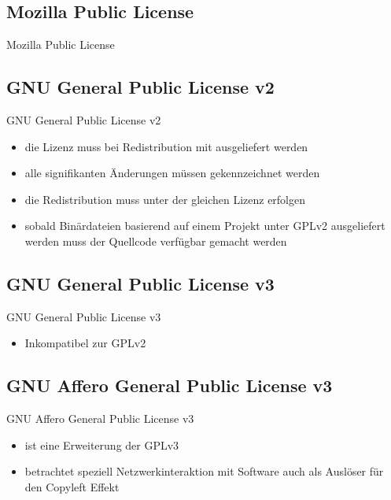 \documentclass{beamer}
\begin{document}
\subsection{Mozilla Public License}
\begin{frame}{Mozilla Public License}
\end{frame}

\subsection{GNU General Public License v2}
\begin{frame}{GNU General Public License v2}

	\begin{itemize}
		\item die Lizenz muss bei Redistribution mit ausgeliefert werden
		\item alle signifikanten Änderungen müssen gekennzeichnet werden
		\item die Redistribution muss unter der gleichen Lizenz erfolgen
		\item sobald Binärdateien basierend auf einem Projekt unter GPLv2
			ausgeliefert werden muss der Quellcode verfügbar gemacht werden
	\end{itemize}
\end{frame}

\subsection{GNU General Public License v3}
\begin{frame}{GNU General Public License v3}
	\begin{itemize}
		\item Inkompatibel zur GPLv2
	\end{itemize}
\end{frame}

\subsection{GNU Affero General Public License v3}
\begin{frame}{GNU Affero General Public License v3}
	\begin{itemize}
		\item ist eine Erweiterung der GPLv3
		\item betrachtet speziell Netzwerkinteraktion mit Software auch als
			Auslöser für den Copyleft Effekt
	\end{itemize}
\end{frame}
\end{document}
